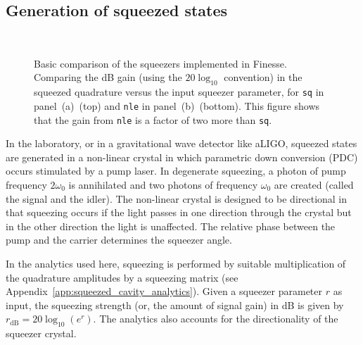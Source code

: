 \documentclass[aps,pra,superscriptaddress,reprint,nofootinbib]{revtex4-1}
\newcommand{\code}[1]{\texttt{#1}}
\begin{document}
\subsection{Generation of squeezed states}

\begin{figure}[ht]%
    \centering
    \\
    \caption{Basic comparison of the squeezers implemented in Finesse. Comparing the dB gain (using the $20 \log_{10}$ convention) in the squeezed quadrature versus the input squeezer parameter, for \code{sq} in panel~(a)~(top) and \code{nle} in panel~(b)~(bottom). This figure shows that the gain from \code{nle} is a factor of two more than \code{sq}.}%
    \label{fig:testing_Finesse_squeezers}%
\end{figure}

In the laboratory, or in a gravitational wave detector like aLIGO, squeezed states are generated in a non-linear crystal in which parametric down conversion (PDC) occurs stimulated by a pump laser. In degenerate squeezing, a photon of pump frequency $2\omega_0$ is annihilated and two photons of frequency $\omega_0$ are created (called the signal and the idler). The non-linear crystal is designed to be directional in that squeezing occurs if the light passes in one direction through the crystal but in the other direction the light is unaffected. The relative phase between the pump and the carrier determines the squeezer angle.


In the analytics used here, squeezing is performed by suitable multiplication of the quadrature amplitudes by a squeezing matrix (see Appendix~\ref{app:squeezed_cavity_analytics}). Given a squeezer parameter $r$ as input, the squeezing strength (or, the amount of signal gain) in dB is given by $r_{\mathrm{dB}} = 20 \log_{10}(e^r)$. The analytics also accounts for the directionality of the squeezer crystal.
\end{document}
